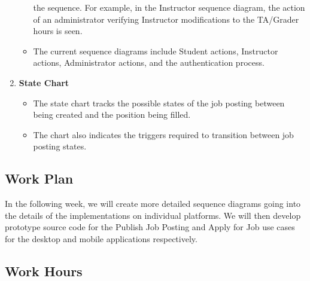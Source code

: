 \documentclass[12pt]{article}
\begin{document}
\begin{enumerate}
\begin{itemize}
                the sequence. For example, in the Instructor sequence diagram, the action of an
                administrator verifying Instructor modifications to the TA/Grader hours is seen.
            \item The current sequence diagrams include Student actions, Instructor actions,
                Administrator actions, and the authentication process.
        \end{itemize}
    \item \textbf{State Chart}
        \begin{itemize}
            \item The state chart tracks the possible states of the job posting between being created and the position being filled.
            \item The chart also indicates the triggers required to transition between job posting states.

        \end{itemize}
\end{enumerate}

\subsection{Work Plan}

In the following week, we will create more detailed sequence diagrams going into the details of the implementations on individual platforms. We will then develop prototype source code for the Publish Job Posting and Apply for Job use cases for the desktop and mobile applications respectively.

\subsection{Work Hours}
\end{document}
